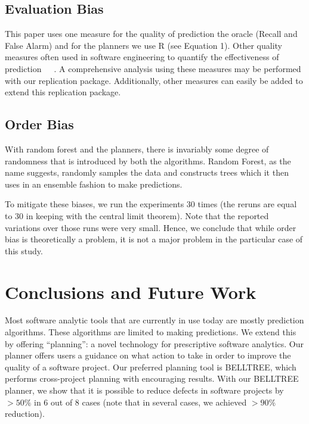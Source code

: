 \documentclass[10pt,journal,compsoc]{IEEEtran}
\begin{document}
\subsection{Evaluation Bias}
This paper uses one measure for the quality of prediction the oracle (Recall and False Alarm) and for the planners we use R (see Equation 1). 
Other quality measures often used in software engineering to quantify
the effectiveness of prediction~\cite{ma07}~\cite{Menzies2007a}~\cite{fu16}. A comprehensive analysis using these measures may be performed with our replication package. Additionally, other measures can easily be added to extend this replication package.

\subsection{Order Bias} 

With random forest and the planners, there is invariably some degree of randomness that is introduced by both the algorithms. Random Forest, as the name suggests, randomly samples the data and constructs trees which it then uses in an ensemble fashion to make predictions. 

To mitigate these biases, we run
the experiments 30 times (the reruns are equal to 30 in keeping with the central limit theorem). Note that the reported variations over those runs
were very small.
Hence, we conclude that while order bias is theoretically a problem,
it is not a major problem in the particular case of this study.

\section{Conclusions and Future Work}
\label{sect:future}

Most software analytic tools that are currently in use today are mostly prediction algorithms. These algorithms are limited to making predictions. We extend this by offering ``planning'': a novel technology for prescriptive software analytics. Our planner offers users a guidance on what action to take in order to improve the quality of a software project. Our preferred planning tool is BELLTREE, which performs cross-project planning with encouraging results. With our BELLTREE planner, we show that it is possible to reduce defects in software projects by $>50\%$ in 6 out of 8 cases (note that in several cases, we achieved $>90\%$ reduction). 
\end{document}
